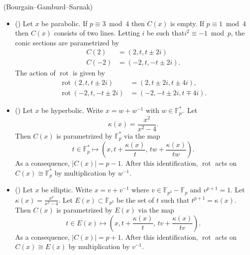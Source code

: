 \documentclass[AHL, Unicode, longabstracts, published]{cedram}
\newcommand{\F}{\mathbb{F}}
\DeclareMathOperator{\rot}{rot}
\begin{document}
\begin{lemm}(Bourgain--Gamburd--Sarnak)\label{lem:BGS-lemmas}
\begin{itemize}
\item (\cite[Lemma~3]{BGS}) Let $x$ be parabolic. If $p\equiv3\bmod4$ then $C(x)$ is empty. If $p\equiv1\bmod4$ then $C(x)$ consists of two lines. Letting $i$ be such that\linebreak$i^{2}\equiv-1\bmod p$, the conic sections are parametrized by
\begin{align*}
C(2) &= (2,t,t \pm 2i) \\
C(-2) &= (-2,t,-t \pm 2i).
\end{align*}
The action of $\rot$ is given by
\begin{align*}
\rot(2,t,t\pm2i) &= (2,t\pm2i,t\pm4i), \\
\rot(-2,t,-t\pm2i) &= (-2,-t\pm2i,t\mp4i).
\end{align*}
\item (\cite[Lemma~4]{BGS}) Let $x$ be hyperbolic. Write $x=w+w^{-1}$ with $w\in\F_{p}^{*}$.~Let
\[
\kappa(x)=\frac{x^{2}}{x^{2}-4}.
\]
Then $C(x)$ is parametrized by $\F_{p}^{*}$ via the map
\[
t\in\F_{p}^{*} \mapsto \left(x,t+\frac{\kappa(x)}{t},\,tw+\frac{\kappa(x)}{tw}\right).
\]
As a consequence, $|C(x)|=p-1$. After this identification, $\rot$ acts on\linebreak$C(x)\cong\F_{p}^{*}$ by multiplication by $w^{-1}$.
\item (\cite[Lemma~5]{BGS}) Let $x$ be elliptic. Write $x=v+v^{-1}$ where $v\in\F_{p^{2}}-\F_{p}$ and $v^{p+1}=1$. Let $\kappa(x)=\frac{x^{2}}{x^{2}-4}$. Let $E(x)\subset\F_{p^{2}}$ be the set of $t$ such that $t^{p+1}=\kappa(x)$. Then $C(x)$ is parametrized by $E(x)$ via the map
\[
t\in E(x)\mapsto\left(x,t+\frac{\kappa(x)}{t},\,tv+\frac{\kappa(x)}{tv}\right).
\]
As a consequence, $|C(x)|=p+1$. After this identification, $\rot$ acts on\linebreak$C(x)\cong E(x)$ by multiplication by $v^{-1}$.
\end{itemize}
\end{lemm}
\end{document}
